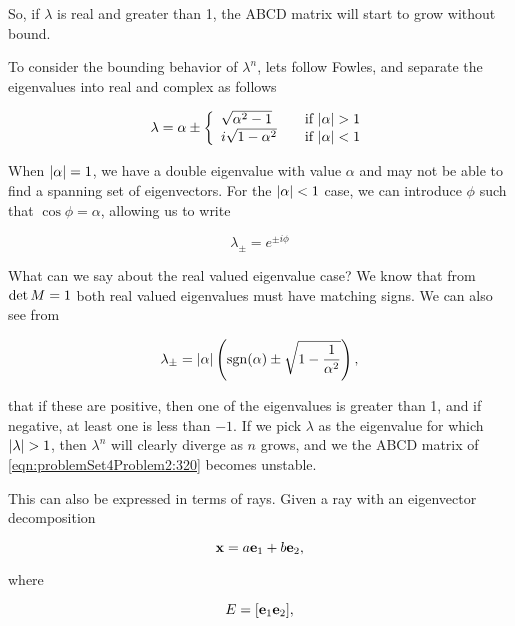 {So, if $\lambda$ is real and greater than 1, the ABCD matrix will start to grow without bound.

To consider the bounding behavior of $\lambda^n$, lets follow Fowles, and separate the eigenvalues into real and complex as follows

\begin{dmath}\label{eqn:problemSet4Problem2:180}
\lambda = \alpha \pm 
\left\{
\begin{array}{l l}
\sqrt{\alpha^2 - 1} & \quad \mbox{if $\Abs{\alpha} > 1$} \\
i \sqrt{1 - \alpha^2} & \quad \mbox{if $\Abs{\alpha} < 1$} 
\end{array}
\right.
\end{dmath}

When ${\left\lvert{\alpha}\right\rvert} = 1$, we have a double eigenvalue with value $\alpha$ and may not be able to find a spanning set of eigenvectors.  For the $\Abs{\alpha} < 1$ case, we can introduce $\phi$ such that $\cos\phi = \alpha$, allowing us to write

\begin{dmath}\label{eqn:problemSet4Problem2:1100}
\lambda_{\pm} = e^{\pm i \phi}
\end{dmath}

What can we say about the real valued eigenvalue case?  We know that from $\operatorname{det} M = 1$ both real valued eigenvalues must have matching signs.  We can also see from

\begin{dmath}\label{eqn:problemSet4Problem2:240}
\lambda_{\pm} = \Abs{\alpha} \left( \sgn(\alpha) \pm \sqrt{1 - \inv{\alpha^2}} \right),
\end{dmath}

that if these are positive, then one of the eigenvalues is greater than 1, and if negative, at least one is less than $-1$.  If we pick $\lambda$ as the eigenvalue for which ${\left\lvert{\lambda}\right\rvert} > 1$, then $\lambda^n$ will clearly diverge as $n$ grows, and we the ABCD matrix of \ref{eqn:problemSet4Problem2:320} becomes unstable.

This can also be expressed in terms of rays.  Given a ray with an eigenvector decomposition

\begin{dmath}\label{eqn:problemSet4Problem2:340}
\Bx = a \Be_1 + b \Be_2,
\end{dmath}

where

\begin{dmath}\label{eqn:problemSet4Problem2:360}
E = [ \Be_1 \Be_2 ],
\end{dmath}

}
